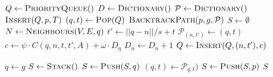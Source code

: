 \begin{algorithm}[ht]
    \caption{$\Function{SearchGraph}(V, E, R, A, p, g, T)$}
    \label{algo:search}
    \begin{algorithmic}[1]
        \setcounter{ALC@line}{0}
        \vspace*{1mm}
        \STATE $Q \leftarrow \Function{PriorityQueue}()$
        \STATE $D \leftarrow \Function{Dictionary}()$
        \STATE $\mathcal{P} \leftarrow \Function{Dictionary}()$
        \STATE $\Function{Insert}(Q, p, T)$
            \STATE $(q, t) \leftarrow \Function{Pop}(Q)$
                \RETURN $\Function{BacktrackPath}(p, g, \mathcal{P})$
            \ENDIF
            \STATE $S \leftarrow \emptyset$
            \STATE $N \leftarrow \Function{Neighbours}(V, E, q)$
                \STATE $t' \leftarrow ||q - n|| / s + t$
                \STATE $\mathcal{P}_{(n, t')} \leftarrow (q, t)$
                \STATE $c \leftarrow \psi \cdot C(q, n, t, t', A) + \omega \cdot D_{\eta}$
                \STATE $D_{n} \leftarrow D_{n} + 1$
                \STATE $Q \leftarrow \Function{Insert}(Q, (n, t'), c)$
            \ENDFOR
        \ENDWHILE
    \end{algorithmic}
\end{algorithm}

\begin{algorithm}[ht]
    \caption{$\Function{BacktrackPath}(p, g, \mathcal{P})$}
    \label{algo:backtrack}
    \begin{algorithmic}[1]
        \setcounter{ALC@line}{0}
        \vspace*{1mm}
        \STATE $q \leftarrow g$
        \STATE $S \leftarrow \Function{Stack}()$
            \STATE $S \leftarrow \Function{Push}(S, q)$
            \STATE $(q, t) \leftarrow \mathcal{P}_{q, t})$
        \ENDWHILE
        \STATE $S \leftarrow \Function{Push}(S, p)$
        \RETURN $S$
    \end{algorithmic}
\end{algorithm}



